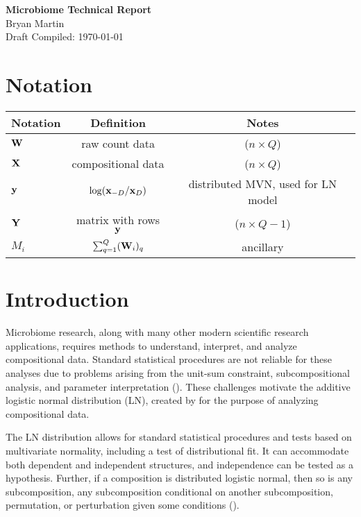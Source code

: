 \documentclass{template}
\begin{document}
\begin{center}
  {\Large \textbf{Microbiome Technical Report}}\\
  {\large Bryan Martin} \\ 
  {Draft Compiled: \today} 
\end{center}

\setcounter{section}{-1}

\section{Notation}
 \begin{table}[ht]
\centering
\begin{tabular}{l|c|c}
\textbf{Notation} & \textbf{Definition} & \textbf{Notes} \\
  \hline \hline
$\mathbf{W}$ & raw count data & ($n\times Q$)\\
$\mathbf{X}$ & compositional data & ($n\times Q$)\\
$\mathbf{y}$ & $\log(\mathbf{x}_{-D}/\mathbf{x}_{D})$ & distributed MVN, used for LN model\\
$\mathbf{Y}$ & matrix with rows $\mathbf{y}$ & ($n \times Q-1$) \\
$M_i$ & $\sum_{q=1}^{Q} (\mathbf{W}_i)_q$ & ancillary
\end{tabular}
\end{table}

\section{Introduction}

Microbiome research, along with many other modern scientific research applications, requires methods to understand, interpret, and analyze compositional data. Standard statistical procedures are not reliable for these analyses due to problems arising from the unit-sum constraint, subcompositional analysis, and parameter interpretation (\cite{aitchison1986statistical}). These challenges motivate the additive logistic normal distribution (LN), created by \cite{aitchison1986statistical} for the purpose of analyzing compositional data.

The LN distribution allows for standard statistical procedures and tests based on multivariate normality, including a test of distributional fit. It can accommodate both dependent and independent structures, and independence can be tested as a hypothesis. Further, if a composition is distributed logistic normal, then so is any subcomposition, any subcomposition conditional on another subcomposition, permutation, or perturbation given some conditions (\cite{aitchison1986statistical}). 
\end{document}
